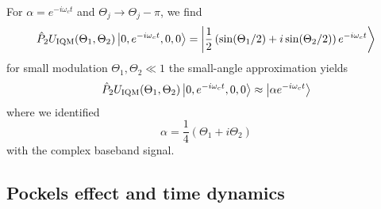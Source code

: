 For $\alpha=e^{-i\omega_ct}$ and $\Theta_j\to\Theta_j-\pi$, we find
\begin{equation}
	\hat{P}_2
	U_\text{IQM}(\Theta_1,\Theta_2)
	\ket{0,e^{-i\omega_ct},0,0}
	=
	\ket{\frac{1}{2}\left(\sin(\Theta_1/2)+i\sin(\Theta_2/2)\right)e^{-i\omega_ct}}
\end{equation}
for small modulation $\Theta_1,\Theta_2\ll1$ the small-angle approximation yields
\begin{equation}
	\hat{P}_2
	U_\text{IQM}(\Theta_1,\Theta_2)
	\ket{0,e^{-i\omega_ct},0,0}
	\approx
	\ket{\alpha e^{-i\omega_ct}}
\end{equation}
where we identified
\begin{equation}
	\alpha
	=
	\frac{1}{4}
	\left(\Theta_1+i\Theta_2\right)
\end{equation}
with the complex baseband signal.


\subsection{Pockels effect and time dynamics}


